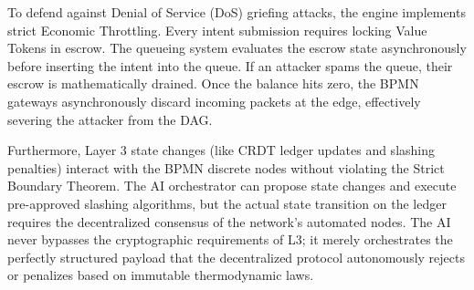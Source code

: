 To defend against Denial of Service (DoS) griefing attacks, the engine implements strict Economic Throttling. Every intent submission requires locking Value Tokens in escrow. The queueing system evaluates the escrow state asynchronously before inserting the intent into the queue. If an attacker spams the queue, their escrow is mathematically drained. Once the balance hits zero, the BPMN gateways asynchronously discard incoming packets at the edge, effectively severing the attacker from the DAG.

Furthermore, Layer 3 state changes (like CRDT ledger updates and slashing penalties) interact with the BPMN discrete nodes without violating the Strict Boundary Theorem. The AI orchestrator can propose state changes and execute pre-approved slashing algorithms, but the actual state transition on the ledger requires the decentralized consensus of the network's automated nodes. The AI never bypasses the cryptographic requirements of L3; it merely orchestrates the perfectly structured payload that the decentralized protocol autonomously rejects or penalizes based on immutable thermodynamic laws.
